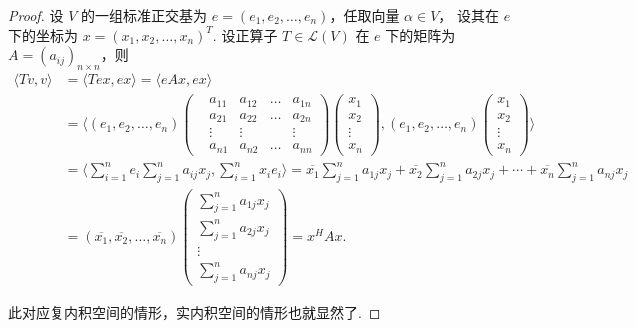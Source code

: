 \begin{proof}
    设 $ V $ 的一组标准正交基为 $ e = (e_1, e_2, \ldots, e_n) $，任取向量 $ \alpha \in V $，
    设其在 $ e $ 下的坐标为 $ x = (x_1, x_2, \ldots, x_n)^{T} $. 设正算子 $ T \in \mathcal{L}(V) $
    在 $ e $ 下的矩阵为 $ A = (a_{ij})_{n \times n}$，则 
    \begin{align*}
        \langle Tv, v \rangle 
        & = \langle Tex, ex \rangle = \langle eAx, ex \rangle \\ 
        & = \langle 
            (e_1, e_2, \ldots ,e_n)
            \begin{pmatrix}
                & a_{11} & a_{12} & \ldots & a_{1n} \\
                & a_{21} & a_{22} & \ldots & a_{2n} \\
                & \vdots & \vdots &        & \vdots \\
                & a_{n1} & a_{n2} & \ldots & a_{nn} 
            \end{pmatrix}
            \begin{pmatrix}
                x_1 \\
                x_2 \\
                \vdots \\
                x_n
            \end{pmatrix} ,
            (e_1, e_2, \ldots ,e_n)
            \begin{pmatrix}
                x_1 \\
                x_2 \\
                \vdots \\
                x_n
            \end{pmatrix}
        \rangle \\
        & = \langle \sum_{i = 1}^{n}e_{i}\sum_{j = 1}^{n}a_{ij}x_{j}, \sum_{i = 1}^{n}x_{i}e_{i} \rangle
        = \overline{x_1}\sum_{j = 1}^{n}a_{1j}x_{j} + \overline{x_2}\sum_{j = 1}^{n}a_{2j}x_{j} + \cdots + \overline{x_n}\sum_{j = 1}^{n}a_{nj}x_{j} \\
        & = (\overline{x_1}, \overline{x_2}, \ldots, \overline{x_n})
        \begin{pmatrix}
            \sum_{j = 1}^{n}a_{1j}x_{j} \\
            \sum_{j = 1}^{n}a_{2j}x_{j} \\
            \vdots \\
            \sum_{j = 1}^{n}a_{nj}x_{j}
        \end{pmatrix}
        = x^{H}Ax. 
    \end{align*}

    此对应复内积空间的情形，实内积空间的情形也就显然了. 
\end{proof}

